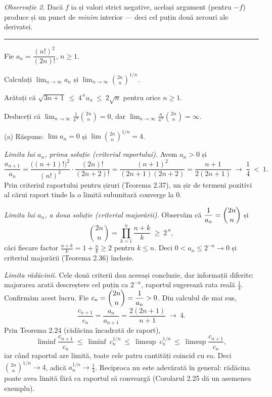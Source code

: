 \emph{Observație 2.} Dacă $f$ ia și valori strict negative, același argument (pentru $-f$) produce și un punct de \emph{minim} interior --- deci cel puțin două zerouri ale derivatei.
\vspace{1mm}\hrule

Fie $a_n=\dfrac{(n!)^{2}}{(2n)!}$, $n\ge1$.
\begin{parti}
  \item Calculați $\displaystyle\lim_{n\to\infty}a_n$ și $\displaystyle\lim_{n\to\infty}\binom{2n}{n}^{\!1/n}$.
  \item Arătați că $\sqrt{3n+1}\ \le\ 4^{\,n}a_n\ \le\ 2\sqrt n$ pentru orice $n\ge1$.
  \item Deduceți că $\displaystyle\lim_{n\to\infty}\frac{1}{4^{\,n}}\binom{2n}{n}=0$, dar $\displaystyle\lim_{n\to\infty}\frac{n}{4^{\,n}}\binom{2n}{n}=\infty$.
\end{parti}
\sol (a) Răspuns: $\lim a_n=0$ și $\lim\binom{2n}{n}^{1/n}=4$.

\emph{Limita lui $a_n$, prima soluție (criteriul raportului).} Avem $a_{n}>0$ și
\[ \frac{a_{n+1}}{a_{n}}=\frac{\bigl((n+1)!\bigr)^{2}}{(n!)^{2}}\cdot\frac{(2n)!}{(2n+2)!}=\frac{(n+1)^{2}}{(2n+1)(2n+2)}=\frac{n+1}{2(2n+1)}\ \longrightarrow\ \frac14\ <\ 1 . \]
Prin criteriul raportului pentru șiruri (Teorema 2.37), un șir de termeni pozitivi al cărui raport tinde la o limită subunitară converge la $0$.

\emph{Limita lui $a_n$, a doua soluție (criteriul majorării).} Observăm că $\dfrac1{a_{n}}=\dbinom{2n}{n}$ și
\[ \binom{2n}{n}=\prod_{k=1}^{n}\frac{n+k}{k}\ \ge\ 2^{\,n}, \]
căci fiecare factor $\frac{n+k}{k}=1+\frac nk\ge2$ pentru $k\le n$. Deci $0<a_{n}\le2^{-n}\to0$ și criteriul majorării (Teorema 2.36) încheie.

\emph{Limita rădăcinii.} Cele două criterii dau aceeași concluzie, dar informații diferite: majorarea arată descreștere cel puțin ca $2^{-n}$, raportul sugerează rata reală $\frac14$. Confirmăm acest lucru. Fie $c_{n}=\dbinom{2n}{n}=\dfrac1{a_n}>0$. Din calculul de mai sus,
\[ \frac{c_{n+1}}{c_{n}}=\frac{a_n}{a_{n+1}}=\frac{2(2n+1)}{n+1}\ \longrightarrow\ 4 . \]
Prin Teorema 2.24 (rădăcina încadrată de raport),
\[ \liminf\frac{c_{n+1}}{c_{n}}\ \le\ \liminf\ c_{n}^{1/n}\ \le\ \limsup\ c_{n}^{1/n}\ \le\ \limsup\frac{c_{n+1}}{c_{n}} , \]
iar când raportul are limită, toate cele patru cantități coincid cu ea. Deci $\binom{2n}{n}^{1/n}\to4$, adică $a_n^{1/n}\to\frac14$. Reciproca nu este adevărată în general: rădăcina poate avea limită fără ca raportul să conveargă (Corolarul 2.25 dă un asemenea exemplu).

